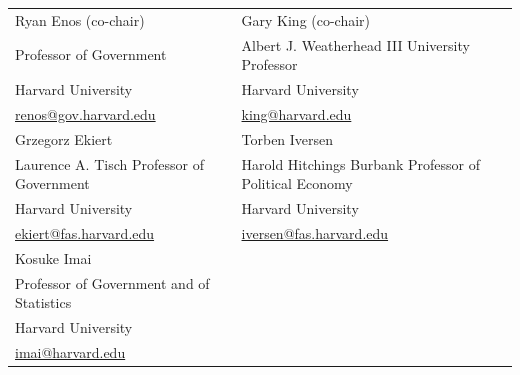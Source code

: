 \documentclass[12pt]{article}
\begin{document}
\begin{footnotesize}
\begin{tabular}{@{}p{}@{\hspace{4mm}}p{}@{}}
Ryan Enos (co-chair) & Gary King (co-chair) \\
Professor of Government & Albert J. Weatherhead III University Professor \\
Harvard University & Harvard University \\
\href{mailto:renos@gov.harvard.edu}{renos@gov.harvard.edu} & \href{mailto:king@harvard.edu}{king@harvard.edu} \\[3mm]
Grzegorz Ekiert & Torben Iversen \\
Laurence A. Tisch Professor of Government & Harold Hitchings Burbank Professor of Political Economy \\
Harvard University & Harvard University \\
\href{mailto:ekiert@fas.harvard.edu}{ekiert@fas.harvard.edu} & \href{mailto:iversen@fas.harvard.edu}{iversen@fas.harvard.edu} \\[3mm]
Kosuke Imai & \\
Professor of Government and of Statistics & \\
Harvard University & \\
\href{mailto:imai@harvard.edu}{imai@harvard.edu} & \\
\end{tabular}

\end{footnotesize}

\thispagestyle{empty}
\end{document}
